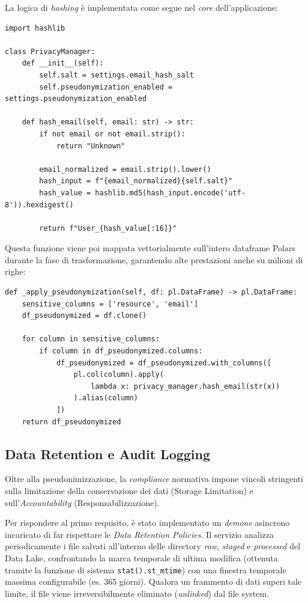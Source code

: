 \documentclass[12pt, a4paper]{report}
\begin{document}
La logica di \textit{hashing} è implementata come segue nel \textit{core} dell'applicazione:

\begin{verbatim}
import hashlib

class PrivacyManager:
    def __init__(self):
        self.salt = settings.email_hash_salt
        self.pseudonymization_enabled = settings.pseudonymization_enabled
    
    def hash_email(self, email: str) -> str:
        if not email or not email.strip():
            return "Unknown"
            
        email_normalized = email.strip().lower()
        hash_input = f"{email_normalized}{self.salt}"
        hash_value = hashlib.md5(hash_input.encode('utf-8')).hexdigest()
        
        return f"User_{hash_value[:16]}"
\end{verbatim}

Questa funzione viene poi mappata vettorialmente sull'intero dataframe Polars durante la fase di trasformazione, garantendo alte prestazioni anche su milioni di righe:

\begin{verbatim}
def _apply_pseudonymization(self, df: pl.DataFrame) -> pl.DataFrame:
    sensitive_columns = ['resource', 'email']
    df_pseudonymized = df.clone()
    
    for column in sensitive_columns:
        if column in df_pseudonymized.columns:
            df_pseudonymized = df_pseudonymized.with_columns([
                pl.col(column).apply(
                    lambda x: privacy_manager.hash_email(str(x))
                ).alias(column)
            ])
    return df_pseudonymized
\end{verbatim}

\subsection{Data Retention e Audit Logging}
Oltre alla pseudonimizzazione, la \textit{compliance} normativa impone vincoli stringenti sulla limitazione della conservazione dei dati (Storage Limitation) e sull'\textit{Accountability} (Responsabilizzazione). 

Per rispondere al primo requisito, è stato implementato un \textit{demone} asincrono incaricato di far rispettare le \textit{Data Retention Policies}. Il servizio analizza periodicamente i file salvati all'interno delle directory \textit{raw}, \textit{staged} e \textit{processed} del Data Lake, confrontando la marca temporale di ultima modifica (ottenuta tramite la funzione di sistema \texttt{stat().st\_mtime}) con una finestra temporale massima configurabile (es. 365 giorni). Qualora un frammento di dati superi tale limite, il file viene irreversibilmente eliminato (\textit{unlinked}) dal file system.
\end{document}

